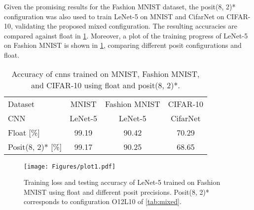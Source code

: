 \documentclass{article}
\begin{document}
	Given the promising results for the Fashion MNIST dataset, the posit(8, 2)* configuration was also used to train LeNet-5 on MNIST and CifarNet on CIFAR-10, validating the proposed mixed configuration. The resulting accuracies are compared against float in \cref{tab:results}. Moreover, a plot of the training progress of LeNet-5 on Fashion MNIST is shown in \cref{fig:training}, comparing different posit configurations and float.
	
	\begin{table}[t]
		\centering
		\caption{Accuracy of \glspl{cnn} trained on MNIST, Fashion MNIST, and CIFAR-10 using float and posit(8, 2)*.}
		\label{tab:results}
		\begin{tabular}{@{}lccc@{}}
			\toprule
			Dataset & MNIST & Fashion MNIST & CIFAR-10 \\
			CNN & LeNet-5 & LeNet-5 & CifarNet \\ \midrule
			Float [\%] & \num{99.19} & \num{90.42} & \num{70.29} \\
			Posit(8, 2)* [\%] & \num{99.17} & \num{90.25} & \num{68.65} \\ \bottomrule
		\end{tabular}
	\end{table}
	
	
	\begin{figure}[t]
		\centering
		\texttt{[image: Figures/plot1.pdf]}
		\vspace*{-1\baselineskip}
		\caption{Training loss and testing accuracy of LeNet-5 trained on Fashion MNIST using float and different posit precisions. Posit(8, 2)* corresponds to configuration O12L10 of \cref{tab:mixed}.}
		\label{fig:training}
	\end{figure}
	
	
\end{document}
